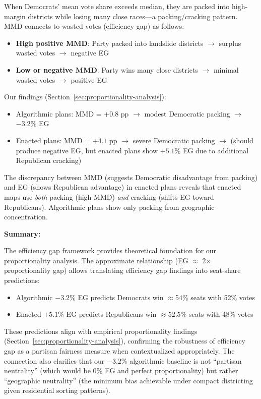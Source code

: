 When Democrats' mean vote share exceeds median, they are packed into high-margin districts while losing many close races---a packing/cracking pattern. MMD connects to wasted votes (efficiency gap) as follows:

\begin{itemize}
    \item \textbf{High positive MMD}: Party packed into landslide districts $\rightarrow$ surplus wasted votes $\rightarrow$ negative EG
    \item \textbf{Low or negative MMD}: Party wins many close districts $\rightarrow$ minimal wasted votes $\rightarrow$ positive EG
\end{itemize}

Our findings (Section~\ref{sec:proportionality-analysis}):
\begin{itemize}
    \item Algorithmic plans: MMD = $+0.8$ pp $\rightarrow$ modest Democratic packing $\rightarrow$ $-3.2\%$ EG
    \item Enacted plans: MMD = $+4.1$ pp $\rightarrow$ severe Democratic packing $\rightarrow$ (should produce negative EG, but enacted plans show $+5.1\%$ EG due to additional Republican cracking)
\end{itemize}

The discrepancy between MMD (suggests Democratic disadvantage from packing) and EG (shows Republican advantage) in enacted plans reveals that enacted maps use \emph{both} packing (high MMD) \emph{and} cracking (shifts EG toward Republicans). Algorithmic plans show only packing from geographic concentration.

\textbf{Summary:}

The efficiency gap framework provides theoretical foundation for our proportionality analysis. The approximate relationship (EG $\approx$ 2$\times$ proportionality gap) allows translating efficiency gap findings into seat-share predictions:

\begin{itemize}
    \item Algorithmic $-3.2\%$ EG predicts Democrats win $\approx$54\% seats with 52\% votes
    \item Enacted $+5.1\%$ EG predicts Republicans win $\approx 52.5\%$ seats with 48\% votes
\end{itemize}

These predictions align with empirical proportionality findings (Section~\ref{sec:proportionality-analysis}), confirming the robustness of efficiency gap as a partisan fairness measure when contextualized appropriately. The connection also clarifies that our $-3.2\%$ algorithmic baseline is not ``partisan neutrality'' (which would be 0\% EG and perfect proportionality) but rather ``geographic neutrality'' (the minimum bias achievable under compact districting given residential sorting patterns).
